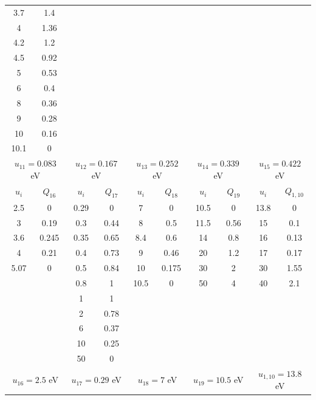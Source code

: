 \documentclass{report}
\begin{document}
\begin{appendices}
\begin{table}
\begin{tabular}{|c|c||c|c||c|c||c|c||c|c|}
3.7   & 1.4  &       &      &       &      &      &      &      &      \\ 
4     & 1.36 &       &      &       &      &      &      &      &      \\ 
4.2   & 1.2  &       &      &       &      &      &      &      &      \\ 
4.5   & 0.92 &       &      &       &      &      &      &      &      \\ 
5     & 0.53 &       &      &       &      &      &      &      &      \\ 
6     & 0.4  &       &      &       &      &      &      &      &      \\ 
8     & 0.36 &       &      &       &      &      &      &      &      \\ 
9     & 0.28 &       &      &       &      &      &      &      &      \\ 
10    & 0.16 &       &      &       &      &      &      &      &      \\ 
10.1  & 0    &       &      &       &      &      &      &      &      \\
\multicolumn{2}{|c||}{$u_{11}=0.083$ eV} &
\multicolumn{2}{c||}{$u_{12}=0.167$ eV} &
\multicolumn{2}{c||}{$u_{13}=0.252$ eV} &
\multicolumn{2}{c||}{$u_{14}=0.339$ eV} &
\multicolumn{2}{c|}{$u_{15}=0.422$ eV}\\
\hline
\hline 
$u_i$ & $Q_{16}$ & $u_i$ & $Q_{17}$ & $u_i$ & $Q_{18}$ & $u_i$ & $Q_{19}$ & $u_i$ & $Q_{1,10}$ \\                                                                             
\hline
2.5  & 0     & 0.29 & 0    & 7    & 0     & 10.5 & 0    & 13.8 & 0    \\
3    & 0.19  & 0.3  & 0.44 & 8    & 0.5   & 11.5 & 0.56 & 15   & 0.1  \\
3.6  & 0.245 & 0.35 & 0.65 & 8.4  & 0.6   & 14   & 0.8  & 16   & 0.13 \\
4    & 0.21  & 0.4  & 0.73 & 9    & 0.46  & 20   & 1.2  & 17   & 0.17 \\
5.07 & 0     & 0.5  & 0.84 & 10   & 0.175 & 30   & 2    & 30   & 1.55 \\
     &       & 0.8  & 1    & 10.5 & 0     & 50   & 4    & 40   & 2.1  \\
     &       & 1    & 1    &      &       &      &      &      &      \\
     &       & 2    & 0.78 &      &       &      &      &      &      \\
     &       & 6    & 0.37 &      &       &      &      &      &      \\
     &       & 10   & 0.25 &      &       &      &      &      &      \\
     &       & 50   & 0    &      &       &      &      &      &      \\
\multicolumn{2}{|c||}{$u_{16}=2.5$ eV} &
\multicolumn{2}{c||}{$u_{17}=0.29$ eV} &
\multicolumn{2}{c||}{$u_{18}=7$ eV} &
\multicolumn{2}{c||}{$u_{19}=10.5$ eV} &
\multicolumn{2}{c|}{$u_{1,10}=13.8$ eV}\\
\hline 
\end{tabular}
\end{table}


\end{appendices}
\end{document}

